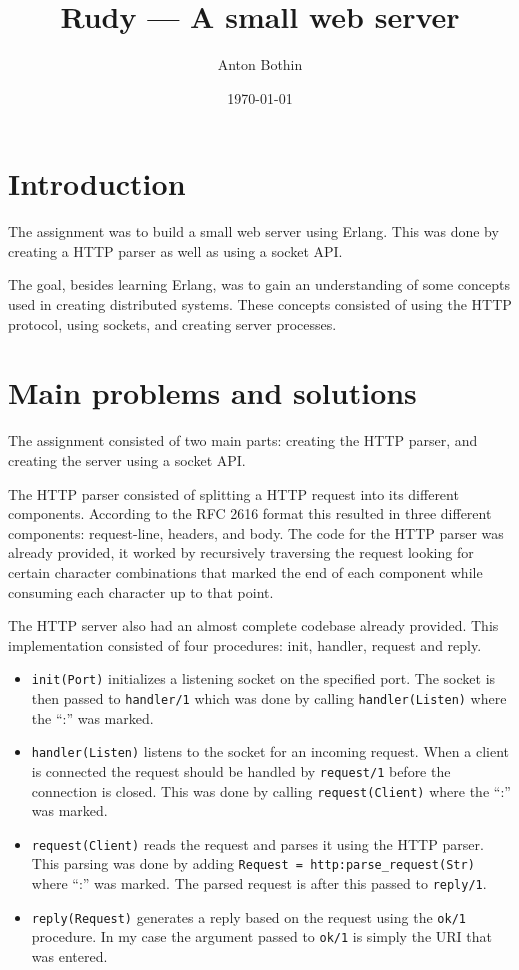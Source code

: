 \documentclass[a4paper, 11pt]{article}
\title{Rudy --- A small web server}
\author{Anton Bothin}
\date{\today{}}
\begin{document}
\maketitle

\section{Introduction}

The assignment was to build a small web server using Erlang. This was done by creating a HTTP parser as well as using a socket API.

The goal, besides learning Erlang, was to gain an understanding of some concepts used in creating distributed systems. These concepts consisted of using the HTTP protocol, using sockets, and creating server processes.

\section{Main problems and solutions}

The assignment consisted of two main parts: creating the HTTP parser, and creating the server using a socket API. 

The HTTP parser consisted of splitting a HTTP request into its different components. According to the RFC 2616 format this resulted in three different components: request-line, headers, and body. The code for the HTTP parser was already provided, it worked by recursively traversing the request looking for certain character combinations that marked the end of each component while consuming each character up to that point.

The HTTP server also had an almost complete codebase already provided. This implementation consisted of four procedures: init, handler, request and reply.

\begin{itemize}

\item \texttt{init(Port)} initializes a listening socket on the specified port. The socket is then passed to \texttt{handler/1} which was done by calling \texttt{handler(Listen)} where the ``:'' was marked.

\item \texttt{handler(Listen)} listens to the socket for an incoming request. When a client is connected the request should be handled by \texttt{request/1} before the connection is closed. This was done by calling \texttt{request(Client)} where the ``:'' was marked.

\item \texttt{request(Client)} reads the request and parses it using the HTTP parser. This parsing was done by adding \verb|Request = http:parse_request(Str)| where ``:'' was marked. The parsed request is after this passed to \texttt{reply/1}.

\item \texttt{reply(Request)} generates a reply based on the request using the \texttt{ok/1} procedure. In my case the argument passed to \texttt{ok/1} is simply the URI that was entered. 

\end{itemize}
\end{document}
